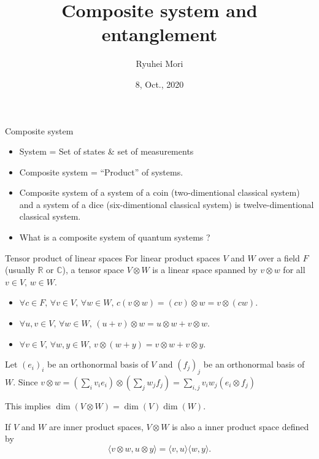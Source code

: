 \documentclass[10pt]{beamer}
\title{Composite system and entanglement}
\author{Ryuhei Mori}
\institute{Tokyo Institute of Technology}
\date{8, Oct., 2020}
\newcommand\emm[1]{\textcolor{redorange}{{#1}}}
\begin{document}
\begin{frame}[plain]
\maketitle
\end{frame}


\begin{frame}{Composite system}
\begin{itemize}
\setlength{\itemsep}{2em}
\item System = Set of states \& set of measurements
\item \emm{Composite} system = ``Product'' of systems.
\item \emm{Composite} system of a system of a coin (two-dimentional classical system) and a system of a dice (six-dimentional classical system) is twelve-dimentional classical system.
\item What is a \emm{composite} system of quantum systems ?
\end{itemize}
\end{frame}

\begin{frame}{Tensor product of linear spaces}
For linear product spaces $V$ and $W$ over a field $F$ (usually $\mathbb{R}$ or $\mathbb{C}$),
a tensor space $V\otimes W$ is a linear space spanned by $v\otimes w$ for all $v\in V,\, w\in W$.

\vspace{1em}
\begin{itemize}
\setlength{\itemsep}{2em}
\item $\forall c\in F,\,\forall v\in V,\, \forall w\in W,\, c(v\otimes w) = (cv)\otimes w = v\otimes (cw) $.
\item $\forall u,v\in V,\, \forall w\in W,\, (u+v)\otimes w = u\otimes w + v\otimes w $.
\item $\forall v\in V,\, \forall w,y\in W,\, v\otimes (w+y) = v\otimes w + v\otimes y $.
\end{itemize}

\vspace{1em}
Let $(e_i)_i$ be an orthonormal basis of $V$ and $(f_j)_j$ be an orthonormal basis of $W$.
Since $v\otimes w = (\sum_i v_i e_i)\otimes(\sum_j w_j f_j) = \sum_{i,j} v_i w_j (e_i\otimes f_j)$

This implies \emm{$\dim(V\otimes W) =\dim(V)\dim(W)$}.

\vspace{1em}
If $V$ and $W$ are inner product spaces, $V\otimes W$ is also a inner product space defined by
\begin{equation*}
\langle v\otimes w, u\otimes y\rangle =
\langle v, u\rangle\langle w, y\rangle.
\end{equation*}
\end{frame}
\end{document}
